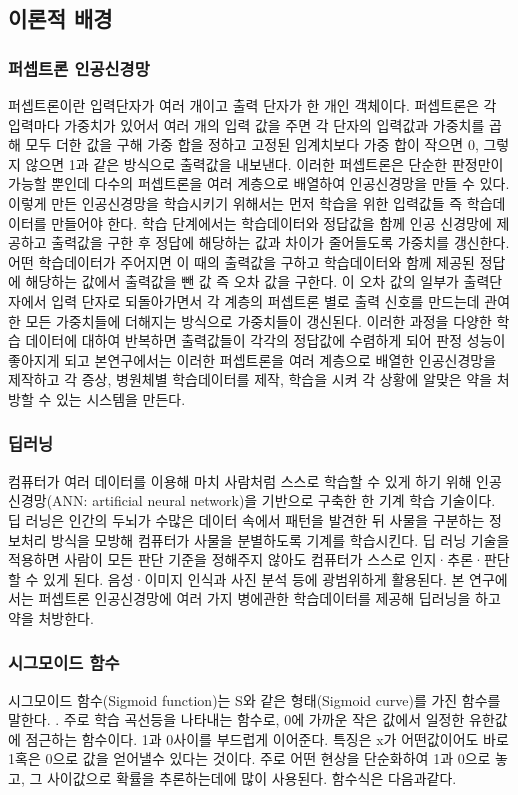 \documentclass{report}
\begin{document}
\subsection{이론적 배경}
\subsubsection{퍼셉트론 인공신경망}
퍼셉트론이란 입력단자가 여러 개이고 출력 단자가 한 개인 객체이다. 퍼셉트론은 각 입력마다 가중치가 있어서 여러 개의 입력 값을 주면 각 단자의 입력값과 가중치를 곱해 모두 더한 값을 구해 가중 합을 정하고 고정된 임계치보다 가중 합이 작으면 0, 그렇지 않으면 1과 같은 방식으로 출력값을 내보낸다. 이러한 퍼셉트론은 단순한 판정만이 가능할 뿐인데 다수의 퍼셉트론을 여러 계층으로 배열하여 인공신경망을 만들 수 있다. 이렇게 만든 인공신경망을 학습시키기 위해서는 먼저 학습을 위한 입력값들 즉 학습데이터를 만들어야 한다. 학습 단계에서는 학습데이터와 정답값을 함께 인공 신경망에 제공하고 출력값을 구한 후 정답에 해당하는 값과 차이가 줄어들도록 가중치를 갱신한다. 어떤 학습데이터가 주어지면 이 때의 출력값을 구하고 학습데이터와 함께 제공된 정답에 해당하는 값에서 출력값을 뺀 값 즉 오차 값을 구한다. 이 오차 값의 일부가 출력단자에서 입력 단자로 되돌아가면서 각 계층의 퍼셉트론 별로 출력 신호를 만드는데 관여한 모든 가중치들에 더해지는 방식으로 가중치들이 갱신된다. 이러한 과정을 다양한 학습 데이터에 대하여 반복하면 출력값들이 각각의 정답값에 수렴하게 되어 판정 성능이 좋아지게 되고 본연구에서는 이러한 퍼셉트론을 여러 계층으로 배열한 인공신경망을 제작하고 각 증상, 병원체별 학습데이터를 제작, 학습을 시켜 각 상황에 알맞은 약을 처방할 수 있는 시스템을 만든다.

\subsubsection{딥러닝}
컴퓨터가 여러 데이터를 이용해 마치 사람처럼 스스로 학습할 수 있게 하기 위해 인공 신경망(ANN: artificial neural network)을 기반으로 구축한 한 기계 학습 기술이다.
딥 러닝은 인간의 두뇌가 수많은 데이터 속에서 패턴을 발견한 뒤 사물을 구분하는 정보처리 방식을 모방해 컴퓨터가 사물을 분별하도록 기계를 학습시킨다. 
딥 러닝 기술을 적용하면 사람이 모든 판단 기준을 정해주지 않아도 컴퓨터가 스스로 인지·추론·판단할 수 있게 된다. 음성·이미지 인식과 사진 분석 등에 광범위하게 활용된다.
본 연구에서는 퍼셉트론 인공신경망에 여러 가지 병에관한 학습데이터를 제공해 딥러닝을 하고 약을 처방한다.


\subsubsection{시그모이드 함수}
시그모이드 함수(Sigmoid function)는 S와 같은 형태(Sigmoid curve)를 가진 함수를 말한다. . 주로 학습 곡선등을 나타내는 함수로, 0에 가까운 작은 값에서 일정한 유한값에 점근하는 함수이다. 1과 0사이를 부드럽게 이어준다. 특징은 x가 어떤값이어도 바로 1혹은 0으로 값을 얻어낼수 있다는 것이다. 주로 어떤 현상을 단순화하여 1과 0으로 놓고, 그 사이값으로 확률을 추론하는데에 많이 사용된다. 함수식은 다음과같다. 
\end{document}
